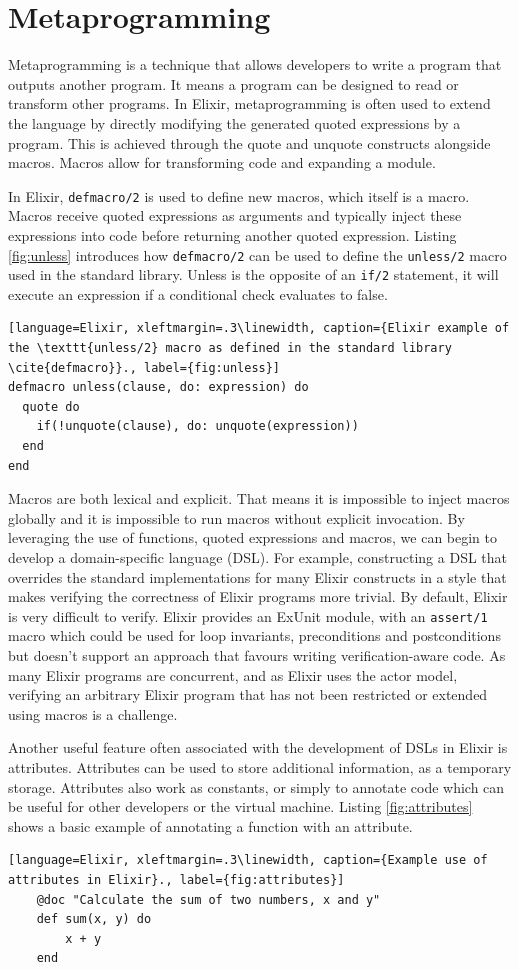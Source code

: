 \section{Metaprogramming}
Metaprogramming is a technique that allows developers to write a program that outputs another program. It means a program can be designed to read or transform other programs. In Elixir, metaprogramming is often used to extend the language by directly modifying the generated quoted expressions by a program. This is achieved through the quote and unquote constructs alongside macros. Macros allow for transforming code and expanding a module.
\par
In Elixir, \texttt{defmacro/2} is used to define new macros, which itself is a macro. Macros receive quoted expressions as arguments and typically inject these expressions into code before returning another quoted expression. Listing \ref{fig:unless} introduces how \texttt{defmacro/2} can be used to define the \texttt{unless/2} macro used in the standard library. Unless is the opposite of an \texttt{if/2} statement, it will execute an expression if a conditional check evaluates to false.
\begin{lstlisting}[language=Elixir, xleftmargin=.3\linewidth, caption={Elixir example of the \texttt{unless/2} macro as defined in the standard library \cite{defmacro}}., label={fig:unless}]
defmacro unless(clause, do: expression) do
  quote do
    if(!unquote(clause), do: unquote(expression))
  end
end
\end{lstlisting}
\par
Macros are both lexical and explicit. That means it is impossible to inject macros globally and it is impossible to run macros without explicit invocation. By leveraging the use of functions, quoted expressions and macros, we can begin to develop a domain-specific language (DSL). For example, constructing a DSL that overrides the standard implementations for many Elixir constructs in a style that makes verifying the correctness of Elixir programs more trivial. By default, Elixir is very difficult to verify. Elixir provides an ExUnit module, with an \texttt{assert/1} macro which could be used for loop invariants, preconditions and postconditions but doesn't support an approach that favours writing verification-aware code. As many Elixir programs are concurrent, and as Elixir uses the actor model, verifying an arbitrary Elixir program that has not been restricted or extended using macros is a challenge.
\par
Another useful feature often associated with the development of DSLs in Elixir is attributes. Attributes can be used to store additional information, as a temporary storage. Attributes also work as constants, or simply to annotate code which can be useful for other developers or the virtual machine. Listing \ref{fig:attributes} shows a basic example of annotating a function with an attribute.
\begin{lstlisting}[language=Elixir, xleftmargin=.3\linewidth, caption={Example use of attributes in Elixir}., label={fig:attributes}]
    @doc "Calculate the sum of two numbers, x and y"
    def sum(x, y) do
        x + y
    end
\end{lstlisting}

